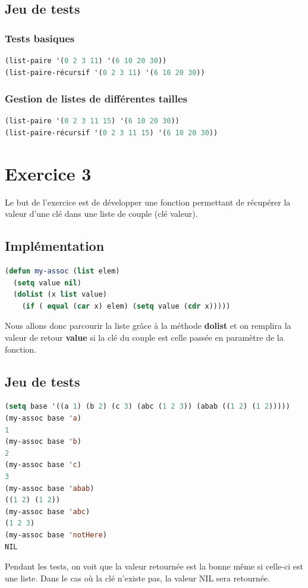 \documentclass[a4paper,10pt]{report}
\begin{document}
	  \section{Jeu de tests}

	  \subsection{Tests basiques}
	  \begin{lstlisting}[language=Lisp]
(list-paire '(0 2 3 11) '(6 10 20 30))
(list-paire-récursif '(0 2 3 11) '(6 10 20 30))
	  \end{lstlisting}

	  \subsection{Gestion de listes de différentes tailles}
	  \begin{lstlisting}[language=Lisp]
(list-paire '(0 2 3 11 15) '(6 10 20 30))
(list-paire-récursif '(0 2 3 11 15) '(6 10 20 30))
	  \end{lstlisting}
	  
	  \chapter{Exercice 3}
	  
	  Le but de l'exercice est de développer une fonction permettant de récupérer la valeur d'une clé dans une liste de couple (clé valeur).
	  
	  \section{Implémentation}
	  \begin{lstlisting}[language=Lisp]
(defun my-assoc (list elem)
  (setq value nil)
  (dolist (x list value)
    (if ( equal (car x) elem) (setq value (cdr x)))))
	  \end{lstlisting}

	  Nous allons donc parcourir la liste grâce à la méthode \textbf{dolist} et on remplira la valeur de retour \textbf{value} si la clé du couple est celle passée en paramètre de la fonction.
	  
	  
	  \section{Jeu de tests}
	  
	  \begin{lstlisting}[language=lisp]
(setq base '((a 1) (b 2) (c 3) (abc (1 2 3)) (abab ((1 2) (1 2)))))
(my-assoc base 'a)
1
(my-assoc base 'b)
2
(my-assoc base 'c)
3
(my-assoc base 'abab)
((1 2) (1 2))
(my-assoc base 'abc)
(1 2 3)
(my-assoc base 'notHere)
NIL
	  \end{lstlisting}
Pendant les tests, on voit que la valeur retournée est la bonne même si celle-ci est une liste. Dans le cas où la clé n'existe pas, la valeur NIL sera retournée.
	  
\end{document}
